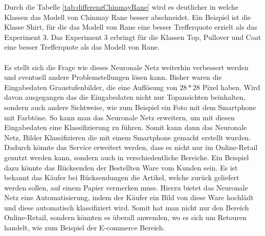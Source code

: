 \documentclass[12pt]{scrreprt}
\begin{document}
Durch die Tabelle \ref{tab:differenzChinmayRane} wird es deutlicher in welche Klassen das Modell von Chinmay Rane besser abschneidet. Ein Beispiel ist die Klasse Shirt, für die das Modell von Rane eine besser Trefferquote erzielt als das Experiment 3. Das Experiment 3 erbringt für die Klassen Top, Pullover und Coat eine besser Trefferquote als das Modell von Rane.\\
\\
Es stellt sich die Frage wie dieses Neuronale Netz weiterhin verbessert werden und eventuell andere Problemstellungen lösen kann. Bisher waren die Eingabedaten Graustufenbilder, die eine Auflösung von $28*28$ Pixel haben. Wird davon ausgegangen das die Eingabedaten nicht nur Topansichten beinhalten, sondern auch andere Sichtweise, wie zum Beispiel ein Foto mit dem Smartphone mit Farbtöne. So kann man das Neuronale Netz erweitern, um mit diesen Eingabedaten eine Klassifizierung zu führen. Somit kann dann das Neuronale Netz, Bilder Klassifizieren die mit einem Smartphone gemacht erstellt wurden. Dadurch könnte das Service erweitert werden, dass es nicht nur im Online-Retail genutzt werden kann, sondern auch in verschiedentliche Bereiche. Ein Beispiel dazu könnte das Rücksenden der Bestellten Ware vom Kunden sein. Es ist bekannt das Käufer bei Rücksendungen die Artikel, welche zurück geliefert werden sollen, auf einem Papier vermerken muss. Hierzu bietet das Neuronale Netz eine Automatisierung, indem der Käufer ein Bild von diese Ware hochlädt und diese automatisch klassifiziert wird. Somit hat man nicht nur den Bereich Online-Retail, sondern könnten es überall anwenden, wo es sich um Retouren handelt, wie zum Beispiel der E-commerce Bereich.
\cleardoubleoddpage




\cleardoublepage
	
\end{document}
